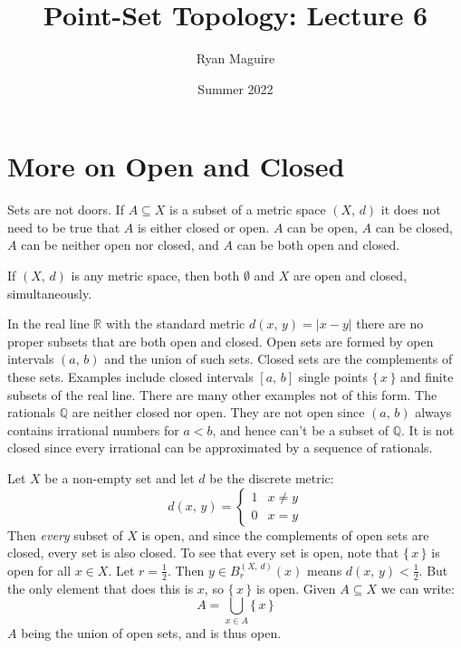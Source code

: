 \documentclass{article}
\title{Point-Set Topology: Lecture 6}
\author{Ryan Maguire}
\date{Summer 2022}
\theoremstyle{plain}
\theoremstyle{normal}
\newenvironment{example}{%
    \pushQED{\qed}\renewcommand{\qedsymbol}{$\blacksquare$}\examplex%
}{%
    \popQED\endexamplex%
}
\begin{document}
    \maketitle
    \section{More on Open and Closed}
        Sets are not doors. If $A\subseteq{X}$ is a subset of a metric space
        $(X,\,d)$ it does not need to be true that $A$ is either closed or
        open. $A$ can be open, $A$ can be closed, $A$ can be neither open nor
        closed, and $A$ can be both open and closed.
        \begin{example}
            If $(X,\,d)$ is any metric space, then both
            $\emptyset$ and $X$ are open and closed, simultaneously.
        \end{example}
        \begin{example}
            In the real line $\mathbb{R}$ with the standard metric
            $d(x,\,y)=|x-y|$ there are no proper subsets that are both open and
            closed. Open sets are formed by open intervals $(a,\,b)$ and the
            union of such sets. Closed sets are the complements of these sets.
            Examples include closed intervals $[a,\,b]$ single points
            $\{\,x\,\}$ and
            finite subsets of the real line. There are many other examples
            not of this form. The rationals $\mathbb{Q}$ are neither closed
            nor open. They are not open since $(a,\,b)$ always contains
            irrational numbers for $a<b$, and hence can't be a subset of
            $\mathbb{Q}$. It is not closed since every irrational can be
            approximated by a sequence of rationals.
        \end{example}
        \begin{example}
            Let $X$ be a non-empty set and let $d$ be the discrete metric:
            \begin{equation}
                d(x,\,y)=
                \begin{cases}
                    1&x\ne{y}\\
                    0&x=y
                \end{cases}
            \end{equation}
            Then \textit{every} subset of $X$ is open, and since the complements
            of open sets are closed, every set is also closed. To see that every
            set is open, note that $\{\,x\,\}$ is open for all $x\in{X}$.
            Let $r=\frac{1}{2}$. Then
            $y\in{B}_{r}^{(X,\,d)}(x)$ means $d(x,\,y)<\frac{1}{2}$. But the
            only element that does this is $x$, so $\{\,x\,\}$ is open.
            Given $A\subseteq{X}$ we can write:
            \begin{equation}
                A=\bigcup_{x\in{A}}\{\,x\,\}
            \end{equation}
            $A$ being the union of open sets, and is thus open.
        \end{example}
\end{document}
